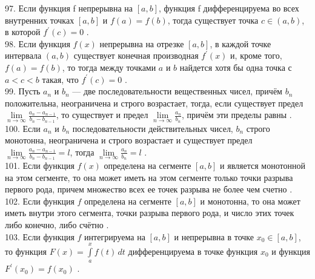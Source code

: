 \documentclass[12pt]{article}
\begin{document}
{97. Если функция f непрерывна на ${\displaystyle [a,b]}$, функция f дифференцируема во всех внутренних точках ${\displaystyle [a,b]}$ и ${\displaystyle f(a)=f(b)}$, тогда существует точка ${\displaystyle c\in (a,b)}$, в которой ${\displaystyle f^{\prime}(c)=0}$ .\\

98. Если функция ${\displaystyle f(x)}$  непрерывна на отрезке ${\displaystyle [a,b]}$, в каждой точке интервала ${\displaystyle (a,b)}$ существует конечная производная ${\displaystyle f^{\prime}(x)}$ и, кроме того,${\displaystyle f(a)=f(b)}$, то тогда между точками ${\displaystyle a}$ и ${\displaystyle b}$ найдется хотя бы одна точка ${\displaystyle с}$ ${\displaystyle a<c<b}$ такая, что ${\displaystyle f^{\prime}(c)=0}$ .\\

99. Пусть ${\displaystyle a_{n}}$ и ${\displaystyle b_{n}}$  — две последовательности вещественных чисел, причём ${\displaystyle b_{n}}$ положительна, неограничена и строго возрастает, тогда, если существует предел ${\displaystyle \lim \limits _{n\to \infty }{\frac {a_{n}-a_{n-1}}{b_{n}-b_{n-1}}}}$, то существует и предел ${\displaystyle \lim \limits _{n\to \infty }{\frac {a_{n}}{b_{n}}}}$, причём эти пределы равны .\\

100. Если ${\displaystyle a_{n}}$ и ${\displaystyle b_{n}}$ последовательности действительных чисел, ${\displaystyle b_{n}}$ строго монотонна, неограничена и строго возрастает и существует предел ${\displaystyle \lim \limits _{n\to \infty }{\frac {a_{n}-a_{n-1}}{b_{n}-b_{n-1}}}=l}$, тогда ${\displaystyle \lim \limits _{n\to \infty } \frac {a_{n}}{b_{n}}=l}$ .\\

101. Если функция ${\displaystyle f(x)}$ определена на сегменте ${\displaystyle [a,b]}$ и является монотонной на этом сегменте, то она может иметь на этом сегменте только точки разрыва первого рода, причем множество всех ее точек разрыва не более чем счетно .\\

102. Если функция ${\displaystyle f}$  определена на сегменте  ${\displaystyle \left [ a,b \right]}$ и монотонна, то она может иметь внутри этого сегмента, точки разрыва первого рода, и число этих точек либо конечно, либо счётно .\\

103. Если функция ${\displaystyle f}$ интегрируема на ${\displaystyle [a,b]}$ и непрерывна в точке ${\displaystyle x_0 \in [a,b]}$, то функция ${\displaystyle F(x)=\int \limits _{a}^{x} f(t)\,dt}$  дифференцируема в точке функция ${\displaystyle x_0}$ и функция ${\displaystyle F^{\prime}(x_0)=f(x_0)}$ .\\

}
\end{document}
